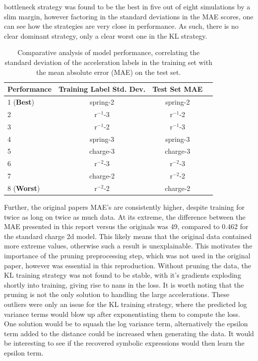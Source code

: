 \documentclass[11pt]{article}
\begin{document}
bottleneck strategy was found to be the best in five out of eight simulations by a slim margin, however factoring in the standard deviations in the MAE scores, one can see how the strategies are very close in performance. As such, there is no clear dominant strategy, only a clear worst one in the KL strategy.
\begin{table}[H]
    \centering
    \begin{tabular}{lccc}
    \toprule
    Performance & Training Label Std. Dev. & Test Set MAE\\
    \midrule
    1 (\textbf{Best}) & spring-2 & spring-2 \\
    2& r$^{-1}$-3 & r$^{-1}$-2  \\
    3& r$^{-1}$-2 & r$^{-1}$-3 \\
    4& spring-3 & spring-3\\
    5& charge-3 & charge-3\\
    6& r$^{-2}$-3 & r$^{-2}$-3\\
    7& charge-2 & r$^{-2}$-2\\
    8 (\textbf{Worst})& r$^{-2}$-2 & charge-2\\
    \bottomrule
    \end{tabular}
    \caption{Comparative analysis of model performance, correlating the standard deviation of the acceleration labels in the training set with the mean absolute error (MAE) on the test set.}
    \label{tab:std_table_2}
\end{table}
Further, the original papers MAE's are consistently higher, despite training for twice as long on twice as much data. At its extreme, the difference between the MAE presented in this report versus the originals was 49, compared to 0.462 for the standard charge 2d model. This likely means that the original data contained more extreme values, otherwise such a result is unexplainable. This motivates the importance of the pruning preprocessing step, which was not used in the original paper, however was essential in this reproduction. Without pruning the data, the KL training strategy was not found to be stable, with it's gradients exploding shortly into training, giving rise to nans in the loss. It is worth noting that the pruning is not the only solution to handling the large accelerations. These outliers were only an issue for the KL training strategy, where the predicted log variance terms would blow up after exponentiating them to compute the loss. One solution would be to squash the log variance term, alternatively the epsilon term added to the distance could be increased when generating the data. It would be interesting to see if the recovered symbolic expressions would then learn the epsilon term.
\end{document}
